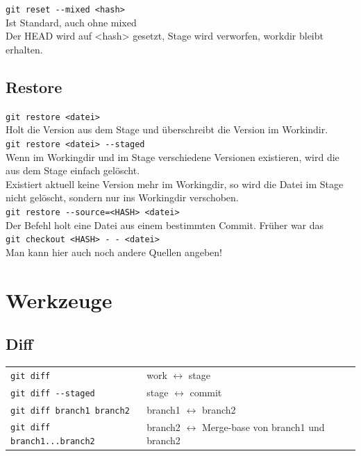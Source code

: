 \documentclass[oneside]{scrreprt}
\begin{document}
\verb+git reset --mixed <hash>+\\
Ist Standard, auch ohne mixed\\
Der HEAD wird auf <hash> gesetzt, Stage wird verworfen, workdir bleibt erhalten.
~\\



\subsection*{Restore}

\verb+git restore <datei>+\\
Holt die Version aus dem Stage und überschreibt die 
Version im Workindir.
~\\

\verb+git restore <datei> --staged+\\
Wenn im Workingdir und im Stage verschiedene Versionen
existieren, wird die aus dem Stage einfach gelöscht.\\

Existiert aktuell keine Version mehr im Workingdir, 
so wird die Datei im Stage nicht gelöscht, sondern nur
ins Workingdir verschoben.
~\\


\verb+git restore --source=<HASH> <datei>+\\
Der Befehl holt eine Datei aus einem bestimmten Commit.
Früher war das\\
 \texttt{git checkout <HASH> -\,- <datei>}\\
 Man kann hier auch noch andere Quellen angeben!


\section*{Werkzeuge}

\subsection*{Diff}

\begin{tabular}{ll}
    \verb+git diff+ & work $\leftrightarrow$ stage\\
    \verb+git diff --staged+ & stage $\leftrightarrow$ commit\\
    \verb+git diff branch1 branch2+ & branch1 $\leftrightarrow$ branch2\\
    \verb+git diff branch1...branch2+ & branch2 $\leftrightarrow$ Merge-base von branch1 und branch2\\
\end{tabular}
~\\
\end{document}
